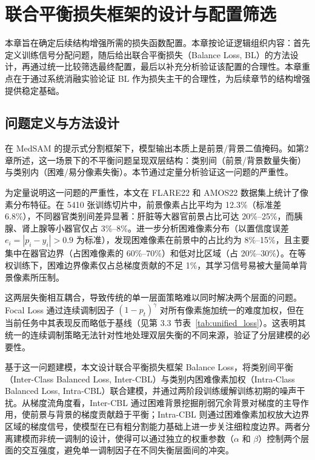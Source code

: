 \chapter{联合平衡损失框架的设计与配置筛选}

本章旨在确定后续结构增强所需的损失函数配置。本章按论证逻辑组织内容：首先定义训练信号分配问题，随后给出联合平衡损失（Balance Loss, BL）的方法设计，再通过统一比较筛选最终配置，最后以补充分析验证该配置的合理性。本章重点在于通过系统消融实验论证 BL 作为损失主干的合理性，为后续章节的结构增强提供稳定基础。

\section{问题定义与方法设计}

在 MedSAM 的提示式分割框架下，模型输出本质上是前景/背景二值掩码。如第2章所述，这一场景下的不平衡问题呈现双层结构：类别间（前景/背景数量失衡）与类别内（困难/易分像素失衡）。本节通过定量分析验证这一问题的严重性。

为定量说明这一问题的严重性，本文在 FLARE22\cite{ma2022flare} 和 AMOS22\cite{ji2022amos} 数据集上统计了像素分布特征。在 5410 张训练切片中，前景像素占比平均为 12.3\%（标准差 6.8\%），不同器官类别间差异显著：肝脏等大器官前景占比可达 20\%--25\%，而胰腺、肾上腺等小器官仅占 3\%--8\%。进一步分析困难像素分布（以置信度误差 $e_i = |p_i - y_i| > 0.9$ 为标准），发现困难像素在前景中的占比约为 8\%--15\%，且主要集中在器官边界（占困难像素的 60\%--70\%）和低对比区域（占 20\%--30\%）。在等权训练下，困难边界像素仅占总梯度贡献的不足 1\%，其学习信号易被大量简单背景像素所压制。

这两层失衡相互耦合，导致传统的单一层面策略难以同时解决两个层面的问题。Focal Loss\cite{lin2017focal} 通过连续调制因子 $(1-p_t)^\gamma$ 对所有像素施加统一的难度加权，但在当前任务中其表现反而略低于基线（见第 3.3 节表~\ref{tab:unified_loss}）。这表明其统一的连续调制策略无法针对性地处理双层失衡的不同来源，验证了分层建模的必要性。

基于这一问题建模，本文设计联合平衡损失框架 Balance Loss，将类别间平衡（Inter-Class Balanced Loss, Inter-CBL）与类别内困难像素加权（Intra-Class Balanced Loss, Intra-CBL）联合建模，并通过两阶段训练缓解训练初期的噪声干扰。从梯度流角度看，Inter-CBL 通过困难背景挖掘削弱冗余背景对梯度的主导作用，使前景与背景的梯度贡献趋于平衡；Intra-CBL 则通过困难像素加权放大边界区域的梯度信号，使模型在已有粗分割能力基础上进一步关注细粒度边界。两者分离建模而非统一调制的设计，使得可以通过独立的权重参数（$\alpha$ 和 $\beta$）控制两个层面的交互强度，避免单一调制因子在不同失衡层面间的冲突。

